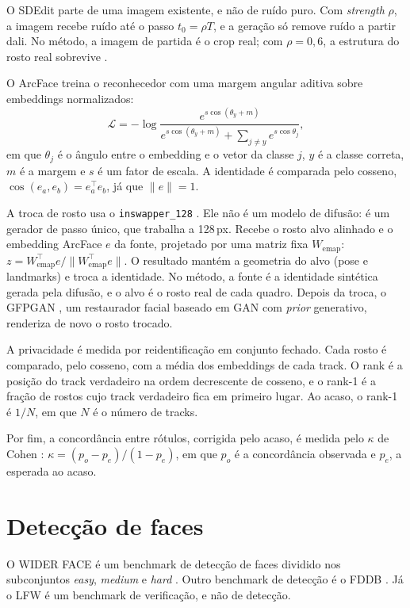 O SDEdit parte de uma imagem existente, e não de ruído puro.
Com \emph{strength} $\rho$, a imagem recebe ruído até o passo $t_0 = \rho T$, e a geração só remove ruído a partir dali.
No método, a imagem de partida é o crop real; com $\rho = 0{,}6$, a estrutura do rosto real sobrevive \citep{sdedit}.

O ArcFace \citep{arcface} treina o reconhecedor com uma margem angular aditiva sobre embeddings normalizados:
\begin{equation}
\mathcal{L} = -\log \frac{e^{s\cos(\theta_y + m)}}{e^{s\cos(\theta_y + m)} + \sum_{j\ne y} e^{s\cos\theta_j}},
\end{equation}
em que $\theta_j$ é o ângulo entre o embedding e o vetor da classe $j$, $y$ é a classe correta, $m$ é a margem e $s$ é um fator de escala.
A identidade é comparada pelo cosseno, $\cos(e_a, e_b) = e_a^\top e_b$, já que $\lVert e\rVert = 1$.

A troca de rosto usa o \texttt{inswapper\_128} \citep{facefusion,insightface}.
Ele não é um modelo de difusão: é um gerador de passo único, que trabalha a 128\,px.
Recebe o rosto alvo alinhado e o embedding ArcFace $e$ da fonte, projetado por uma matriz fixa $W_{\mathrm{emap}}$: $z = W_{\mathrm{emap}}^\top e / \lVert W_{\mathrm{emap}}^\top e \rVert$.
O resultado mantém a geometria do alvo (pose e landmarks) e troca a identidade.
No método, a fonte é a identidade sintética gerada pela difusão, e o alvo é o rosto real de cada quadro.
Depois da troca, o GFPGAN \citep{gfpgan}, um restaurador facial baseado em GAN com \emph{prior} generativo, renderiza de novo o rosto trocado.

A privacidade é medida por reidentificação em conjunto fechado.
Cada rosto é comparado, pelo cosseno, com a média dos embeddings de cada track.
O rank é a posição do track verdadeiro na ordem decrescente de cosseno, e o rank-1 é a fração de rostos cujo track verdadeiro fica em primeiro lugar.
Ao acaso, o rank-1 é $1/N$, em que $N$ é o número de tracks.

Por fim, a concordância entre rótulos, corrigida pelo acaso, é medida pelo $\kappa$ de Cohen \citep{cohen}: $\kappa = (p_o - p_e)/(1 - p_e)$, em que $p_o$ é a concordância observada e $p_e$, a esperada ao acaso.

\section{Detecção de faces}

O WIDER FACE é um benchmark de detecção de faces dividido nos subconjuntos \emph{easy}, \emph{medium} e \emph{hard} \citep{widerface}.
Outro benchmark de detecção é o FDDB \citep{fddb}.
Já o LFW \citep{wildface} é um benchmark de verificação, e não de detecção.

